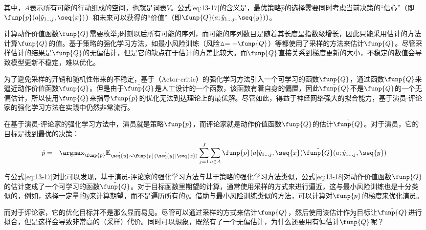 \noindent 其中，$A$表示所有可能的行动组成的空间，也就是词表$V$。公式\eqref{eq:13-17}的含义是，最优策略$\hat{p}$的选择需要同时考虑当前决策的“信心”（即$\funp{p}(a|\hat{{y}}_{1 \ldots j},\seq{x})$）和未来可以获得的“价值”（即$\funp{Q}(a;\hat{{y}}_{1 \ldots j},\seq{y})$）。

\parinterval 计算动作价值函数$\funp{Q}$需要枚举$j$时刻以后所有可能的序列，而可能的序列数目是随着其长度呈指数级增长，因此只能采用估计的方法计算$\funp{Q}$的值。基于策略的强化学习方法，如最小风险训练（风险$\vartriangle=-\funp{Q}$）等都使用了采样的方法来估计$\funp{Q}$。尽管采样估计的结果是$\funp{Q}$的无偏估计，但是它的缺点在于估计的方差比较大。而$\funp{Q}$直接关系到梯度更新的大小，不稳定的数值会导致模型更新不稳定，难以优化。

\parinterval 为了避免采样的开销和随机性带来的不稳定，基于{\small{}}（Actor-critic）的强化学习方法引入一个可学习的函数$\tilde{\funp{Q}}$，通过函数$\tilde{\funp{Q}}$来逼近动作价值函数$\funp{Q}$。但是由于$\tilde{\funp{Q}}$是人工设计的一个函数，该函数有着自身的偏置，因此$\tilde{\funp{Q}}$不是$\funp{Q}$的一个无偏估计，所以使用$\tilde{\funp{Q}}$来指导$\funp{p}$的优化无法到达理论上的最优解。尽管如此，得益于神经网络强大的拟合能力，基于演员-评论家的强化学习方法在实践中仍然非常流行。

\parinterval 在基于演员-评论家的强化学习方法中，演员就是策略$\funp{p}$，而评论家就是动作价值函数$\funp{Q}$的估计$\tilde{\funp{Q}}$。对于演员，它的目标是找到最优的决策：
\begin{eqnarray}
\hat{p} & = & \argmax_{\funp{p}}\mathbb{E}_{\hat{\seq{y}} \sim \funp{p}(\hat{\seq{y}} | \seq{x})}\sum_{j=1}^J\sum_{a \in A}\funp{p}(a|\hat{{y}}_{1 \ldots j},\seq{x})\tilde{\funp{Q}}(a;\hat{{y}}_{1 \ldots j},\seq{y})
\label{eq:13-18}
\end{eqnarray}

\parinterval 与公式\eqref{eq:13-17}对比可以发现，基于演员-评论家的强化学习方法与基于策略的强化学习方法类似，公式\eqref{eq:13-18}对动作价值函数$\funp{Q}$的估计变成了一个可学习的函数$\tilde{\funp{Q}}$。对于目标函数里期望的计算，通常使用采样的方式来进行逼近，这与最小风险训练也是十分类似的，例如，选择一定量的$\hat{y}$来计算期望，而不是遍历所有的$\hat{y}$。借助与最小风险训练类似的方法，可以计算对$\funp{p}$的梯度来优化演员。

\parinterval 而对于评论家，它的优化目标并不是那么显而易见。尽管可以通过采样的方式来估计$\funp{Q}$，然后使用该估计作为目标让$\tilde{\funp{Q}}$进行拟合，但是这样会导致非常高的（采样）代价。同时可以想象，既然有了一个无偏估计，为什么还要用有偏估计$\tilde{\funp{Q}}$呢？

